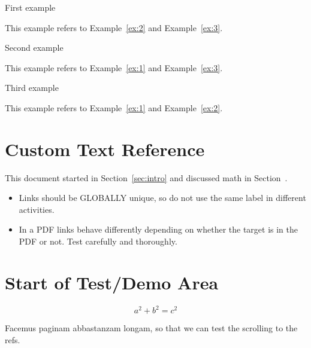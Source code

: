 \documentclass{ximera}
\begin{document}
\begin{example} \label{ex:1}
 First example  

 This example refers to Example~\ref{ex:2} and Example~\ref{ex:3}.

\end{example}
\begin{example} \label{ex:2}
 Second example  

  This example refers to Example~\ref{ex:1} and Example~\ref{ex:3}.
\end{example}
\begin{example} \label{ex:3}
 Third example  

  This example refers to Example~\ref{ex:1} and Example~\ref{ex:2}.
\end{example}


\section{Custom Text Reference}

This document started in Section~\ref{sec:intro} and discussed math in Section~.


\begin{remark}

    \begin{itemize}
        \item  Links should be GLOBALLY unique, so do not use the same label in different activities.
        \item  In a PDF links behave differently depending on whether the target is in the PDF or not. 
            Test carefully and thoroughly.
    \end{itemize}
\end{remark}


\section{Start of Test/Demo Area}

\begin{equation}
a^2 + b^2 = c^2    \label{eq:pyth2}
\end{equation}

Facemus paginam abbastanzam longam, so that we can test the scrolling to the refs.

\lipsum[1]

\lipsum[2]

\lipsum[3]

\lipsum[4]

\hrulefill
\end{document}

